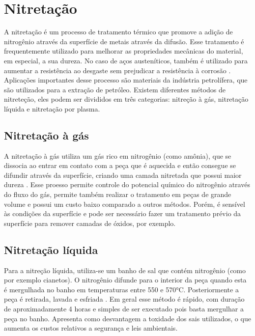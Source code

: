 \documentclass[]{politex}
\begin{document}
\section{Nitretação}
	A nitretação é um processo de tratamento térmico que promove a adição de nitrogênio através da superfície de metais através da difusão. Esse tratamento é frequentemente utilizado para melhorar as propriedades mecânicas do material, em especial, a sua dureza. No caso de aços austeníticos, também é utilizado para aumentar a resistência ao desgaste sem prejudicar a resistência à corrosão \cite{baranowska2010importance}.
	 Aplicações importantes desse processo são materiais da indústria petrolífera, que são utilizados para a extração de petróleo.
	 Existem diferentes métodos de nitreteção, eles podem ser divididos em três categorias: nitreção à gás,  nitretação líquida e nitretação por plasma.
	 
\subsection{Nitretação à gás}
	A nitretação à gás utiliza um gás rico em nitrogênio (como amônia), que se dissocia ao entrar em contato com a peça que é aquecida e então consegue se difundir através da superfície, criando uma camada nitretada que possui maior dureza \cite{zimmermannnitretaccao}.   
	Esse proesso permite controle do potencial químico do nitrogênio através do fluxo do gás, permite também realizar o tratamento em peças de grande volume e possui um custo baixo comparado a outros métodos. Porém, é sensível às condições da superfície e pode ser necessário fazer um tratamento prévio da superfície para remover camadas de óxidos, por exemplo.
	 
\subsection{Nitretação líquida}
	Para a nitreção líquida, utiliza-se um banho de sal que contém nitrogênio (como por exemplo cianetos). O nitrogênio difunde para o interior da peça quando esta é mergulhada no banho em temperaturas entre 550 e 570°C. Posteriormente a peça é retirada, lavada e esfriada \cite{zimmermannnitretaccao}. 
	Em geral esse método é rápido, com duração de aproximadamente 4 horas e simples de ser executado pois basta mergulhar a peça no banho. Apresenta como desvantagem a toxidade dos sais utilizados, o que aumenta os custos relativos a segurança e leis ambientais.
	
\end{document}
